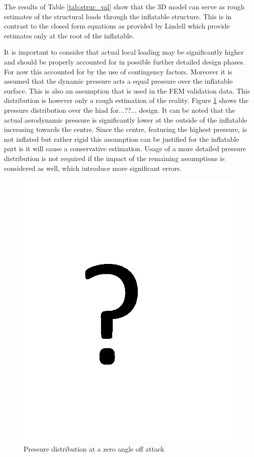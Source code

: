The results of Table \ref{tab:struc_val} show that the 3D model can serve as rough estimates of the structural loads through the inflatable structure. This is in contrast to the closed form equations as provided by Lindell\cite{Lindell2006} which provide estimates only at the root of the inflatable. 

It is important to consider that actual local loading may be significantly higher and should be properly accounted for in possible further detailed design phases. For now this accounted for by the use of contingency factors. Moreover it is assumed that the dynamic pressure acts a equal pressure over the inflatable surface. This is also an assumption that is used in the FEM validation data. This distribution is however only a rough estimation of the reality. Figure \ref{fig:struc_pres} shows the pressure distribution over the \gls{hiad} for...??... design. It can be noted that the actual aerodynamic pressure is significantly lower at the outside of the inflatable increasing towards the centre. Since the centre, featuring the highest pressure, is not inflated but rather rigid this assumption can be justified for the inflatable part is it will cause a conservative estimation. Usage of a more detailed pressure distribution is not required if the impact of the remaining assumptions is considered as well, which introduce more significant errors.

\begin{figure}[b]
\centering
\includegraphics[width=1.0\textwidth]{./Figure/Structure/temp.png}
\caption{Pressure distribution at a zero angle off attack} 
\label{fig:struc_pres}
\end{figure}

